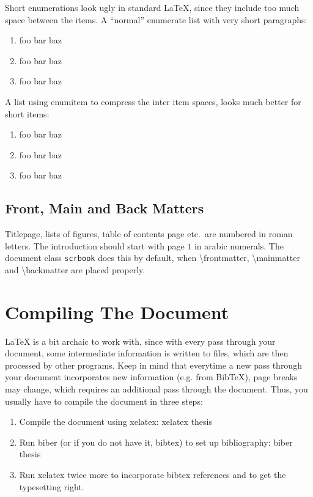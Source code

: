 \documentclass[{{cookiecutter.project_slug}}.tex]{subfiles}
\begin{document}
    Short enumerations look ugly in  standard \LaTeX{}, since they include 
    too much  space between the  items.  A ``normal'' enumerate  list with 
    very short paragraphs:                                                 
    \begin{enumerate}
        \item foo bar baz
        \item foo bar baz
        \item foo bar baz
    \end{enumerate}

    A list using enumitem to compress the inter item spaces, looks much better for short items:
    \begin{enumerate}[noitemsep]
        \item foo bar baz
        \item foo bar baz
        \item foo bar baz
    \end{enumerate}

    \subsection{Front, Main and Back Matters}

    Titlepage, lists of figures, table of contents page etc.\ are numbered 
    in  roman letters.   The introduction  should start  with page  $1$ in 
    arabic  numerals.   The document  class  \verb+scrbook+  does this  by 
    default,  when \textbackslash  frontmatter, \textbackslash  mainmatter 
    and \textbackslash backmatter are placed properly.                     



    \section{Compiling The Document}
    \LaTeX{}  is  a bit  archaic  to  work  with,  since with  every  pass 
    through  your document,  some intermediate  information is  written to 
    files,  which are  then processed  by  other programs.   Keep in  mind 
    that  everytime a  new  pass through  your  document incorporates  new 
    information (e.g. from BibTeX), page breaks may change, which requires
    an  additional pass  through the  document. Thus, you  usually have  to
    compile the document in three steps:
    \begin{enumerate}
        \item Compile the document using xelatex: xelatex thesis
        \item Run biber  (or if  you do  not have  it, bibtex)  to set  up
              bibliography: biber thesis
        \item Run xelatex  twice more to incorporate  bibtex references and
              to get the typesetting right.
    \end{enumerate}
\end{document}
